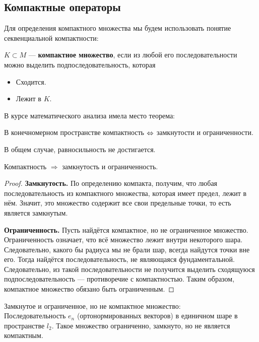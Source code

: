 \documentclass[12pt]{article}
\begin{document}
	\subsection{Компактные операторы}
	
		Для определения компактного множества мы будем использовать понятие секвенциальной компактности:
		\begin{defi}
			$K \subset M$ --- \textbf{компактное множество}, если из любой его последовательности можно выделить подпоследовательность,
			которая
			\begin{itemize}
				\item Сходится.
				\item Лежит в $K$.
			\end{itemize}
		\end{defi}
	
		В курсе математического анализа имела место теорема:
	
		\begin{theorem}
			В конечномерном пространстве компактность $\Leftrightarrow$ замкнутости и ограниченности.
		\end{theorem}
	
		В общем случае, равносильность не достигается.
	
		\begin{theorem}
			Компактность $\Rightarrow$ замкнутость и ограниченность.
		\end{theorem}
		\begin{proof}
			\textbf{Замкнутость.} По определению компакта, получим, что любая последовательность из 
			компактного множества, которая имеет предел, лежит в нём. Значит, это множество содержит все свои предельные точки, то есть 
			является замкнутым.
		
			\textbf{Ограниченность.} Пусть найдётся компактное, но не ограниченное множество. Ограниченность означает, что всё множество
			лежит внутри некоторого шара. Следовательно, какого бы радиуса мы не брали шар, всегда найдутся точки вне его. Тогда
			найдётся последовательность, не являющаяся фундаментальной. Следовательно, из такой последовательности не получится выделить
			сходящуюся подпоследовательность --- противоречие с компактностью. Таким образом, компактное множество обязано быть ограниченным.
		\end{proof}
	
		\example Замкнутое и ограниченное, но не компактное множество: \\
		Последовательность $e_n$ (ортонормированных векторов) в единичном шаре в пространстве $l_2$. Такое множество ограниченно, 
		замкнуто, но не является компактным.
	
\end{document}
